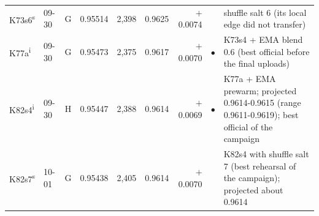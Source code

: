 {\begin{tabular}{@{}llcrrrrcp{7.9cm}@{}}
K73s6\textsuperscript{s} & 09-30 & G & 0.95514 & 2{,}398 & 0.9625 & \ensuremath{+}0.0074 &  & shuffle salt 6 (its local edge did not transfer) \\
K77a\textsuperscript{i} & 09-30 & G & 0.95473 & 2{,}375 & 0.9617 & \ensuremath{+}0.0070 & $\bullet$ & K73s4 + EMA blend 0.6 (best official before the final uploads) \\
K82s4\textsuperscript{i} & 09-30 & H & 0.95447 & 2{,}388 & 0.9614 & \ensuremath{+}0.0069 & $\bullet$ & K77a + EMA prewarm; projected 0.9614-0.9615 (range 0.9611-0.9619); best official of the campaign \\
K82s7\textsuperscript{s} & 10-01 & G & 0.95438 & 2{,}405 & 0.9614 & \ensuremath{+}0.0070 &  & K82s4 with shuffle salt 7 (best rehearsal of the campaign); projected about 0.9614 \\
\bottomrule
\end{tabular}
}
